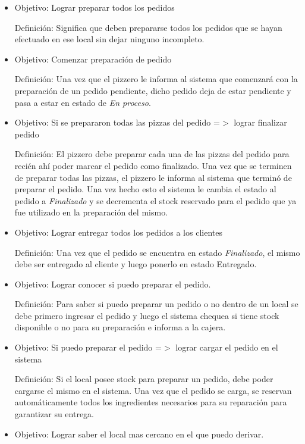 \documentclass[a4paper,11pt] {article}
\begin{document}
\begin{itemize}
 \item 
Objetivo: Lograr preparar todos los pedidos

Definici\'on: Significa que deben prepararse todos los pedidos que se hayan efectuado en ese local sin dejar ninguno incompleto.

\item 
Objetivo: Comenzar preparaci\'on de pedido

Definici\'on: Una vez que el pizzero le informa al sistema que comenzar\'a con la preparaci\'on de un pedido pendiente, dicho pedido deja de estar pendiente y pasa a estar en estado de \textit{En proceso}.

\item 
Objetivo: Si se prepararon todas las pizzas del pedido =$>$ lograr finalizar pedido

Definici\'on: El pizzero debe preparar cada una de las pizzas del pedido para reci\'en ah\'i poder marcar el pedido como finalizado. Una vez que se terminen de preparar todas las pizzas, el pizzero le informa al sistema que termin\'o de preparar el pedido. Una vez hecho esto el sistema le cambia el estado al pedido a \textit{Finalizado} y se decrementa el stock reservado para el pedido que ya fue utilizado en la preparaci\'on del mismo.

\item 
Objetivo: Lograr entregar todos los pedidos a los clientes

Definici\'on: Una vez que el pedido se encuentra en estado \textit{Finalizado}, el mismo debe ser entregado al cliente y luego ponerlo en estado Entregado.

\item 
Objetivo: Lograr conocer si puedo preparar el pedido.

Definici\'on: Para saber si puedo preparar un pedido o no dentro de un local se debe primero ingresar el pedido y luego el sistema chequea si tiene stock disponible o no para su preparaci\'on e informa a la cajera.

\item 
Objetivo: Si puedo preparar el pedido =$>$ lograr cargar el pedido en el sistema

Definici\'on: Si el local posee stock para preparar un pedido, debe poder cargarse el mismo en el sistema. Una vez que el pedido se carga, se reservan autom\'aticamente todos los ingredientes necesarios para su reparaci\'on para garantizar su entrega.

\item 
Objetivo: Lograr saber el local mas cercano en el que puedo derivar.


\end{itemize}
\end{document}

